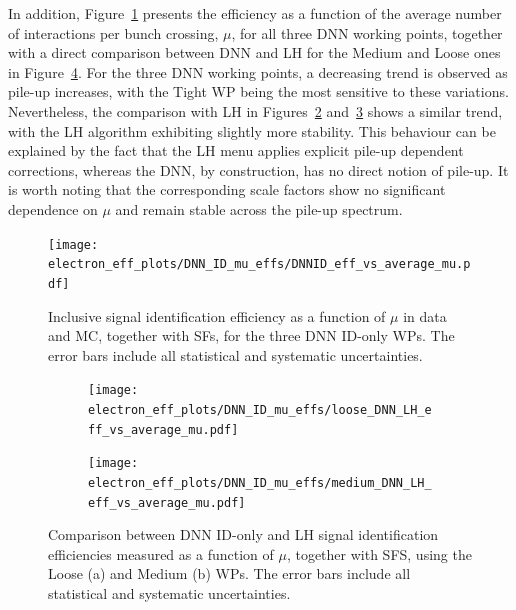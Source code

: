 In addition, Figure~\ref{fig:eff_sfs_dnn_mu} presents the efficiency as a function of the average number of interactions per bunch crossing, $\mu$, for all three DNN working points, together with a direct comparison between DNN and LH for the Medium and Loose ones in Figure~\ref{fig:eff_sfs_dnn_vs_lh_mu}. For the three DNN working points, a decreasing trend is observed as pile-up increases, with the Tight WP being the most sensitive to these variations. Nevertheless, the comparison with LH in Figures~\ref{fig:eff_sfs_dnn_vs_lh_loose_mu} and~\ref{fig:eff_sfs_dnn_vs_lh_medium_mu} shows a similar trend, with the LH algorithm exhibiting slightly more stability. This behaviour can be explained by the fact that the LH menu applies explicit pile-up dependent corrections, whereas the DNN, by construction, has no direct notion of pile-up.
It is worth noting that the corresponding scale factors show no significant dependence on $\mu$ and remain stable across the pile-up spectrum.
\begin{figure}[htbp]
  \centering
  \texttt{[image: electron\_eff\_plots/DNN\_ID\_mu\_effs/DNNID\_eff\_vs\_average\_mu.pdf]}
  \caption{
    Inclusive signal identification efficiency as a function of $\mu$ in data and MC, together with SFs, 
    for the three DNN ID-only WPs. 
    The error bars include all statistical and systematic uncertainties.}
  \label{fig:eff_sfs_dnn_mu}
\end{figure}


\begin{figure}[htbp]
  \centering

  \begin{subfigure}[b]{0.48\textwidth}
    \centering
    \texttt{[image: electron\_eff\_plots/DNN\_ID\_mu\_effs/loose\_DNN\_LH\_eff\_vs\_average\_mu.pdf]}
    \caption{}
    \label{fig:eff_sfs_dnn_vs_lh_loose_mu}
  \end{subfigure}
  \hfill
  \begin{subfigure}[b]{0.48\textwidth}
    \centering
    \texttt{[image: electron\_eff\_plots/DNN\_ID\_mu\_effs/medium\_DNN\_LH\_eff\_vs\_average\_mu.pdf]}
    \caption{}
    \label{fig:eff_sfs_dnn_vs_lh_medium_mu}
  \end{subfigure}

  \caption{
    Comparison between DNN ID-only and LH signal identification efficiencies measured as a function of $\mu$, together with SFS, using the Loose (a) and Medium (b) WPs. 
    The error bars include all statistical and systematic uncertainties.}
  \label{fig:eff_sfs_dnn_vs_lh_mu}
\end{figure}


